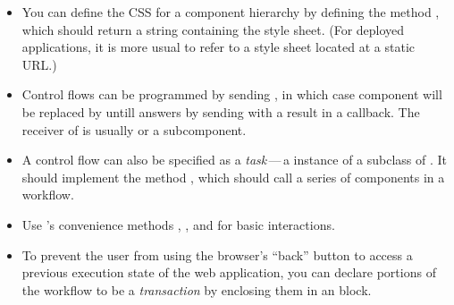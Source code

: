\documentclass[a4paper,10pt,twoside]{book}
\begin{document}
\begin{itemize}
  \item You can define the CSS for a component hierarchy by defining the method , which should return a string containing the style sheet.
  (For deployed applications, it is more usual to refer to a style sheet located at a static URL.)
  \item Control flows can be programmed by sending , in which case component  will be replaced by  untill  answers by sending  with a result in a callback.
  The receiver of  is usually  or a subcomponent.
  \item A control flow can also be specified as a \emph{task}\,---\,a instance of a subclass of . It should implement the method , which should call a series of components in a workflow.
  \item Use 's convenience methods , ,  and  for basic interactions.
  \item To prevent the user from using the browser's ``back'' button to access a previous execution state of the web application, you can declare portions of the workflow to be a \emph{transaction} by enclosing them in an  block.
\end{itemize}

\ifx\wholebook\relax\else 
   
   
\end{document}
